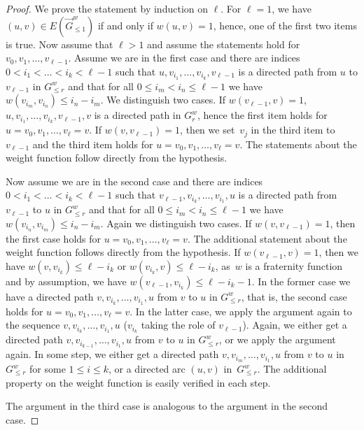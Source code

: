 \documentclass[10pt,a4paper]{amsart}
\begin{document}
\begin{proof}
We prove the statement by induction on $\ell$. For $\ell=1$, 
we have $(u,v)\in E(\vec{G}^w_{\leq 1})$ if and only if 
$w(u,v)=1$, hence, one of the first two items is true. 
Now assume that 
$\ell>1$ and assume the statements hold for 
$v_0,v_1,\ldots, v_{\ell-1}$. Assume we are in the first case and 
there are indices $0< i_1<\ldots<i_k< \ell-1$ 
such that $u,v_{i_1}, \ldots, v_{i_k},v_{\ell-1}$ is a directed 
path from $u$ to $v_{\ell-1}$ in $G^w_{\leq r}$ and that 
for all $0\leq i_m<i_n\leq \ell-1$ we have 
$w(v_{i_m}, v_{i_n})\leq i_n-i_m$. 
We distinguish
two cases. If $w(v_{\ell-1},v)=1$, $u,v_{i_1}, \ldots, 
v_{i_k},v_{\ell-1},v$ is a directed path in $G^w_r$, hence the
first item holds for $u=v_0,v_1,\ldots, v_\ell=v$. If $w(v,v_{\ell-1})=1$, then we set~$v_j$ in 
the third item to $v_{\ell-1}$ and the third item holds for 
$u=v_0,v_1,\ldots, v_\ell=v$. The statements about the 
weight function follow directly from the hypothesis. 

Now assume we are in the second case and there are indices 
$0< i_1<\ldots<i_k< \ell-1$ 	such that $v_{\ell-1},v_{i_k}, 
\ldots, v_{i_1},u$ is a directed path from $v_{\ell-1}$ to $u$ 
in $G^w_{\leq r}$ and that for all $0\leq i_m<i_n\leq \ell-1$ we have 
$w(v_{i_n},v_{i_m})\leq i_n-
i_m$. Again we distinguish two cases. If $w(v,v_{\ell-1})=1$, then 
the first case holds for \mbox{$u=v_0,v_1,\ldots, v_\ell=v$}. The 
additional statement about the weight function follows directly
from the hypothesis. If $w(v_{\ell-1},v)=1$, then we have 
$w(v,v_{i_k})\leq \ell-i_k$ or $w(v_{i_k},v)\leq \ell-i_k$, 
as~$w$ is a fraternity function and by assumption, we have 
$w(v_{\ell-1},v_{i_k})\leq \ell-i_k-1$. In the former case 
we have a directed path $v,v_{i_k}, 
\ldots, v_{i_1},u$ from $v$ to $u$ in $G^w_{\leq r}$, that is, 
the second case holds for $u=v_0,v_1,\ldots, v_\ell=v$. 
In the latter case, we apply the argument again to the sequence 
$v,v_{i_k}, \ldots, v_{i_1},u$ ($v_{i_k}$ taking the role of 
$v_{\ell-1}$). Again, we either get a directed path $v,v_{i_{k-1}}, 
\ldots, v_{i_1},u$ from $v$ to $u$ in $G^w_{\leq r}$, or
we apply the argument again. In some step, we either get
a directed path $v,v_{i_{m}}, \ldots, v_{i_1},u$ from 
$v$ to $u$ in $G^w_{\leq r}$ for some $1\leq i\leq k$, or 
a directed arc $(u,v)$ in~$G^w_{\leq r}$. The additional property on 
the weight function is easily verified in each step. 

The argument in the third case is analogous to the argument 
in the second case. 
\end{proof}
\end{document}
